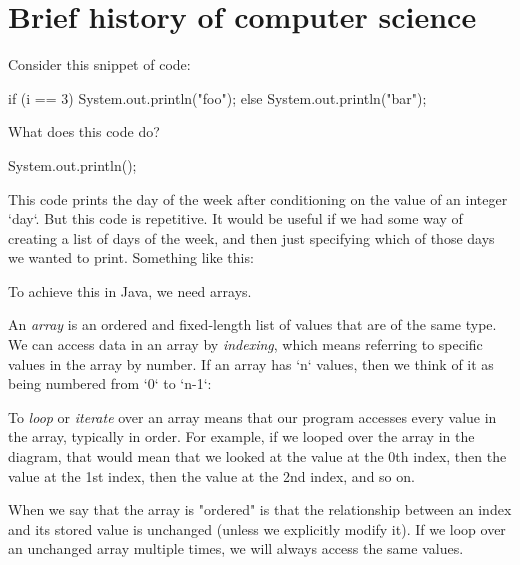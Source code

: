 \section{Brief history of computer science}


Consider this snippet of code:

\begin{code}
if (i == 3) System.out.println("foo");
else System.out.println("bar");
\end{code}

\begin{example}
What does this code do?

\begin{code}
System.out.println();
\end{code}

This code prints the day of the week after conditioning on the value of an integer `day`. But this code is repetitive. It would be useful if we had some way of creating a list of days of the week, and then just specifying which of those days we wanted to print. Something like this:
\end{example}

To achieve this in Java, we need arrays.

\begin{definition}
An \emph{array} is an ordered and fixed-length list of values that are of the same type. We can access data in an array by \emph{indexing}, which means referring to specific values in the array by number. If an array has `n` values, then we think of it as being numbered from `0` to `n-1`:



\end{definition}

To \emph{loop} or \emph{iterate} over an array means that our program accesses every value in the array, typically in order. For example, if we looped over the array in the diagram, that would mean that we looked at the value at the 0th index, then the value at the 1st index, then the value at the 2nd index, and so on.

When we say that the array is "ordered" is that the relationship between an index and its stored value is unchanged (unless we explicitly modify it). If we loop over an unchanged array multiple times, we will always access the same values.

